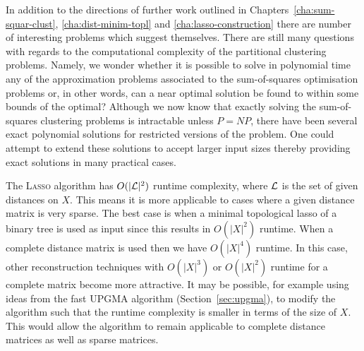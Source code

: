 In addition to the directions of further work outlined in
Chapters~\ref{cha:sum-squar-clust}, \ref{cha:dist-minim-topl} and
\ref{cha:lasso-construction} there are number of interesting problems which
suggest themselves.  There are still many questions with regards to the
computational complexity of the partitional clustering problems.  Namely, we
wonder whether it is possible to solve in polynomial time any of the
approximation problems associated to the sum-of-squares optimisation problems
or, in other words, can a near optimal solution be found to within some bounds
of the optimal?  Although we now know that exactly solving the sum-of-squares
clustering problems is intractable unless $P=NP$, there have been several
exact polynomial solutions for restricted versions of the problem.  One could
attempt to extend these solutions to accept larger input sizes thereby
providing exact solutions in many practical cases.

The \textsc{Lasso} algorithm has $O(|{\mathcal L}|^2)$ runtime complexity, where ${\mathcal L}$
is the set of given distances on $X$.  This means it is more applicable to
cases where a given distance matrix is very sparse.  The best case is when a
minimal topological lasso of a binary tree is used as input since this results
in $O(|X|^2)$ runtime.  When a complete distance matrix is used then we have
$O(|X|^4)$ runtime.  In this case, other reconstruction techniques with
$O(|X|^3)$ or $O(|X|^2)$ runtime for a complete matrix become more attractive.
It may be possible, for example using ideas from the fast \textsc{UPGMA}
algorithm (Section~\ref{sec:upgma}), to modify the algorithm such that the
runtime complexity is smaller in terms of the size of $X$.  This would allow
the algorithm to remain applicable to complete distance matrices as well as
sparse matrices.

